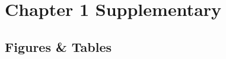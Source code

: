 


\section{Chapter 1 Supplementary}
\label{apdx:supplemental}


\subsection{Figures \& Tables}
\label{subapdx:figtabs}
\newpage



